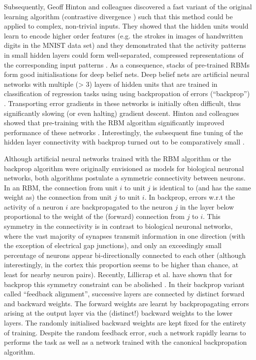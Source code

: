 \documentclass[11pt]{article}
\begin{document}
Subsequently, Geoff Hinton and colleagues discovered a fast variant of
the original learning algorithm (contrastive divergence
\citep{Hinton2002,Carreira-Perpinan2005}) such that this method could
be applied to complex, non-trivial inputs. They showed that the hidden
units would learn to encode higher order features (e.g. the strokes in
images of handwritten digits in the MNIST data set) and they
demonstrated that the activity patterns in small hidden layers could
form well-separated, compressed representations of the corresponding
input patterns \citep{Hinton2006b}. As a consequence, stacks of
pre-trained RBMs form good initialisations for deep belief nets. Deep
belief nets are artificial neural networks with multiple (\textgreater
3) layers of hidden units that are trained in classification of
regression tasks using using backpropation of errors (``backprop'')
\citep{Rumelhart1986}. Transporting error gradients in these networks
is initially often difficult, thus significantly slowing (or even
halting) gradient descent. Hinton and colleagues showed that
pre-training with the RBM algorithm significantly improved performance
of these networks \citep{Hinton2006a,Hinton2006b}. Interestingly, the
subsequent fine tuning of the hidden layer connectivity with backprop
turned out to be comparatively small \citep{Erhan2010}.

Although artificial neural networks trained with the RBM algorithm or
the backprop algorithm were originally envisioned as models for
biological neuronal networks, both algorithms postulate a symmetric
connectivity between neurons. In an RBM, the connection from unit $i$
to unit $j$ is identical to (and has the same weight as) the
connection from unit $j$ to unit $i$. In backprop, errors w.r.t the
activity of a neuron $i$ are backpropagated to the neuron $j$ in the
layer below proportional to the weight of the (forward) connection
from $j$ to $i$. %
This symmetry in the connectivity is in contrast to biological
neuronal networks, where the vast majority of synapses transmit
information in one direction (with the exception of electrical gap
junctions), and only an exceedingly small percentage of neurons appear
bi-directionally connected to each other (although interestingly, in
the cortex this proportion seems to be higher than chance, at least
for nearby neuron pairs). %
Recently, Lillicrap et al. have shown that for backprop this symmetry
constraint can be abolished \citep{Lillicrap2014}. In their backprop
variant called ``feedback alignment'', successive layers are connected
by distinct forward and backward weights. The forward weights are
learnt by backpropagating errors arising at the output layer via the
(distinct!) backward weights to the lower layers. The randomly
initialised backward weights are kept fixed for the entirety of
training. Despite the random feedback error, such a network rapidly
learns to performs the task as well as a network trained with the
canonical backpropation algorithm.
\end{document}
